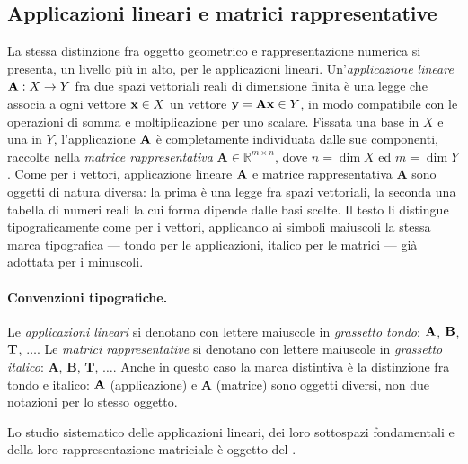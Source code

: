 \subsection{Applicazioni lineari e matrici rappresentative}
\label{sec:applic_matrici}

La stessa distinzione fra oggetto geometrico e rappresentazione 
numerica si presenta, un livello più in alto, per le applicazioni 
lineari. Un'\textit{applicazione lineare} $\mathbf{A} : X \to Y$ fra 
due spazi vettoriali reali di dimensione finita è una legge che 
associa a ogni vettore $\mathbf{x} \in X$ un vettore $\mathbf{y}=\mathbf{A}\mathbf{x} \in Y$, in 
modo compatibile con le operazioni di somma e moltiplicazione 
per uno scalare. Fissata una base in $X$ e una in $Y$, 
l'applicazione $\mathbf{A}$ è completamente individuata dalle sue 
componenti, raccolte nella \textit{matrice rappresentativa} 
$\bm{A} \in \mathbb{R}^{m \times n}$, dove $n = \dim X$ ed 
$m = \dim Y$. Come per i vettori, applicazione lineare $\mathbf{A}$ e 
matrice rappresentativa $\bm{A}$ sono oggetti di natura diversa: 
la prima è una legge fra spazi vettoriali, la seconda una 
tabella di numeri reali la cui forma dipende dalle basi scelte. 
Il testo li distingue tipograficamente come per i vettori, 
applicando ai simboli maiuscoli la stessa marca tipografica 
--- tondo per le applicazioni, italico per le matrici --- già 
adottata per i minuscoli.

\paragraph{Convenzioni tipografiche.}
Le \textit{applicazioni lineari} si denotano con lettere 
maiuscole in \textit{grassetto tondo}: $\mathbf{A}$, $\mathbf{B}$, 
$\mathbf{T}$, $\ldots$. Le \textit{matrici rappresentative} si 
denotano con lettere maiuscole in \textit{grassetto italico}: 
$\bm{A}$, $\bm{B}$, $\bm{T}$, $\ldots$. Anche in questo caso 
la marca distintiva è la distinzione fra tondo e italico: 
$\mathbf{A}$ (applicazione) e $\bm{A}$ (matrice) sono oggetti 
diversi, non due notazioni per lo stesso oggetto.

Lo studio sistematico delle applicazioni lineari, dei loro 
sottospazi fondamentali e della loro rappresentazione matriciale 
è oggetto del .


